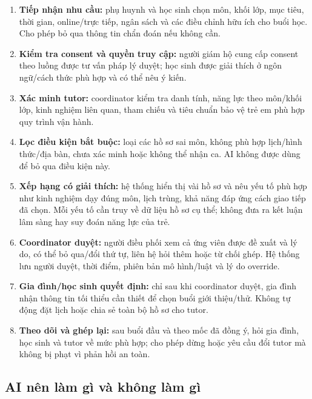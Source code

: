 \documentclass[11pt,a4paper]{article}
\begin{document}
\begin{enumerate}
  \item \textbf{Tiếp nhận nhu cầu:} phụ huynh và học sinh chọn môn, khối lớp,
  mục tiêu, thời gian, online/trực tiếp, ngân sách và các điều chỉnh hữu ích
  cho buổi học. Cho phép bỏ qua thông tin chẩn đoán nếu không cần.
  \item \textbf{Kiểm tra consent và quyền truy cập:} người giám hộ cung cấp
  consent theo luồng được tư vấn pháp lý duyệt; học sinh được giải thích ở
  ngôn ngữ/cách thức phù hợp và có thể nêu ý kiến.
  \item \textbf{Xác minh tutor:} coordinator kiểm tra danh tính, năng lực theo
  môn/khối lớp, kinh nghiệm liên quan, tham chiếu và tiêu chuẩn bảo vệ trẻ em
  phù hợp quy trình vận hành.
  \item \textbf{Lọc điều kiện bắt buộc:} loại các hồ sơ sai môn, không phù hợp
  lịch/hình thức/địa bàn, chưa xác minh hoặc không thể nhận ca. AI không được
  dùng để bỏ qua điều kiện này.
  \item \textbf{Xếp hạng có giải thích:} hệ thống hiển thị vài hồ sơ và nêu
  yếu tố phù hợp như kinh nghiệm dạy đúng môn, lịch trùng, khả năng đáp ứng
  cách giao tiếp đã chọn. Mỗi yếu tố cần truy về dữ liệu hồ sơ cụ thể; không
  đưa ra kết luận lâm sàng hay suy đoán năng lực của trẻ.
  \item \textbf{Coordinator duyệt:} người điều phối xem cả ứng viên được đề
  xuất và lý do, có thể bỏ qua/đổi thứ tự, liên hệ hỏi thêm hoặc từ chối ghép.
  Hệ thống lưu người duyệt, thời điểm, phiên bản mô hình/luật và lý do override.
  \item \textbf{Gia đình/học sinh quyết định:} chỉ sau khi coordinator duyệt,
  gia đình nhận thông tin tối thiểu cần thiết để chọn buổi giới thiệu/thử.
  Không tự động đặt lịch hoặc chia sẻ toàn bộ hồ sơ cho tutor.
  \item \textbf{Theo dõi và ghép lại:} sau buổi đầu và theo mốc đã đồng ý,
  hỏi gia đình, học sinh và tutor về mức phù hợp; cho phép dừng hoặc yêu cầu đổi
  tutor mà không bị phạt vì phản hồi an toàn.
\end{enumerate}

\subsection{AI nên làm gì và không làm gì}
\end{document}
